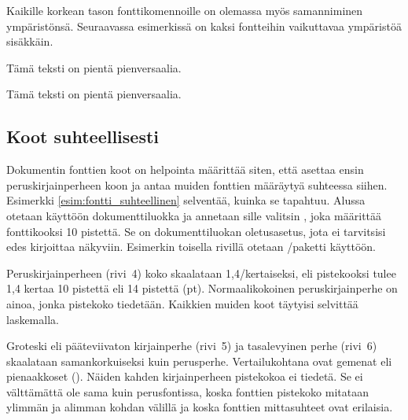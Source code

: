 
Kaikille korkean tason fonttikomennoille on olemassa myös samanniminen
ympäristönsä. Seuraavassa esimerkissä on kaksi fontteihin vaikuttavaa
ympäristöä sisäkkäin.


\begin{koodilohkosis}
  \begin{footnotesize}
    \begin{scshape}
      Tämä teksti on pientä pienversaalia.
    \end{scshape}
  \end{footnotesize}
\end{koodilohkosis}

\begin{tulossis}
  \begin{footnotesize}
    \begin{scshape}
      Tämä teksti on pientä pienversaalia.
    \end{scshape}
  \end{footnotesize}
\end{tulossis}


\subsection{Koot suhteellisesti}
\label{luku:fontti_suhteellinen}

Dokumentin fonttien koot on helpointa määrittää siten, että asettaa
ensin peruskirjainperheen koon ja antaa muiden fonttien määräytyä
suhteessa siihen. Esimerkki \ref{esim:fontti_suhteellinen} selventää,
kuinka se tapahtuu. Alussa otetaan käyttöön dokumenttiluokka
 ja annetaan sille valitsin \koodi{10pt}, joka määrittää
fonttikooksi 10 pistettä. Se on dokumenttiluokan ole\-tus\-ase\-tus,
jota ei tarvitsisi edes kirjoittaa näkyviin. Esimerkin toisella rivillä
otetaan \-/paketti käyttöön.

Peruskirjainperheen (rivi~4) koko skaalataan 1,4\-/kertaiseksi, eli
pistekooksi tulee 1,4 kertaa 10 pistettä eli 14 pistettä (pt).
Normaalikokoinen peruskirjainperhe on ainoa, jonka pistekoko tiedetään.
Kaikkien muiden koot täytyisi selvittää laskemalla.

Groteski eli pääteviivaton kirjainperhe (rivi~5) ja tasalevyinen perhe
(rivi~6) skaalataan samankorkuiseksi kuin perusperhe. Vertailukohtana
ovat gemenat eli pienaakkoset (). Näiden kahden
kirjainperheen pistekokoa ei tiedetä. Se ei välttämättä ole sama kuin
perusfontissa, koska fonttien pistekoko mitataan ylimmän ja alimman
kohdan välillä ja koska fonttien mittasuhteet ovat erilaisia.

